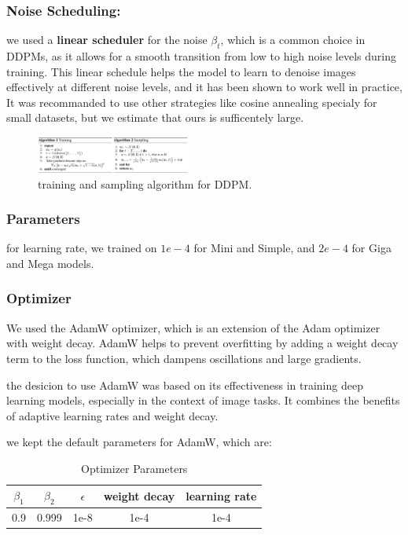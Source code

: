 \documentclass[twocolumn,superscriptaddress,aps]{revtex4-1}
\begin{document}
\subsubsection{Noise Scheduling:}
we used a \textbf{linear scheduler} for the noise $\beta_t$, which is a common choice in DDPMs, as it allows for a smooth transition from low to high noise levels during training. This linear schedule helps the model to learn to denoise images effectively at different noise levels, and it has been shown to work well in practice, It was recommanded to use other strategies like cosine annealing specialy for small datasets, but we estimate that ours is sufficentely large.

\begin{figure}[H]
	\centering
	\includegraphics[width=0.45\textwidth]{figures/training-sampling-algo-ddpm.png}
	\caption{training and sampling algorithm for DDPM.}
	\label{fig:train-sampling-algo-ddpm}
\end{figure}

\subsubsection{Parameters}
for learning rate, we trained on $1e-4$ for Mini and Simple, and $2e-4$ for Giga and Mega models.

\subsubsection{Optimizer}
We used the AdamW optimizer, which is an extension of the Adam optimizer with weight decay. AdamW helps to prevent overfitting by adding a weight decay term to the loss function, which dampens oscillations and large gradients.

the desicion to use AdamW was based on its effectiveness in training deep learning models, especially in the context of image tasks. It combines the benefits of adaptive learning rates and weight decay.

we kept the default parameters for AdamW, which are:
\begin{table}[ht]
	\centering
	\begin{tabular}{|c|c|c|c|c|}
		\hline
		$\beta_1$ & $\beta_2$ & $\epsilon$ & weight decay & learning rate \\
		\hline
		0.9       & 0.999     & 1e-8       & 1e-4         & 1e-4          \\
		\hline
	\end{tabular}
	\caption{Optimizer Parameters}
	\label{tab:optimizer_params}
\end{table}
\end{document}
